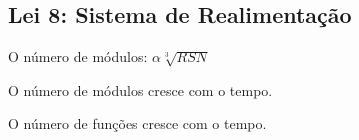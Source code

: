 \subsection{Lei 8: Sistema de Realimentação}

\begin{hypothesis}
	O número de módulos: $\alpha\sqrt[3]{RSN} $
\end{hypothesis}
\begin{hypothesis}
	O número de módulos cresce com o tempo.
\end{hypothesis}
\begin{hypothesis}
	O número de funções cresce com o tempo.
\end{hypothesis}

